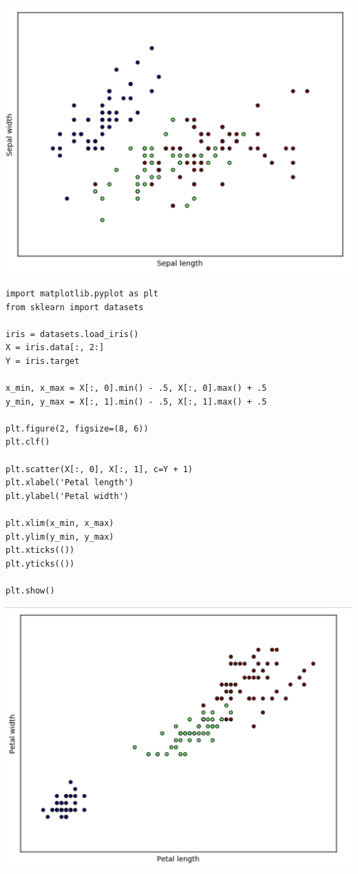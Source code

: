 \documentclass[12pt,reqno]{amsart}
\theoremstyle{definition}
\theoremstyle{remark}
\begin{document}
\includegraphics[width=0.9 \textwidth]{2.png}


\begin{lstlisting}
import matplotlib.pyplot as plt
from sklearn import datasets

iris = datasets.load_iris()
X = iris.data[:, 2:]
Y = iris.target

x_min, x_max = X[:, 0].min() - .5, X[:, 0].max() + .5
y_min, y_max = X[:, 1].min() - .5, X[:, 1].max() + .5

plt.figure(2, figsize=(8, 6))
plt.clf()

plt.scatter(X[:, 0], X[:, 1], c=Y + 1)
plt.xlabel('Petal length')
plt.ylabel('Petal width')

plt.xlim(x_min, x_max)
plt.ylim(y_min, y_max)
plt.xticks(())
plt.yticks(())

plt.show()
\end{lstlisting}

\includegraphics[width=0.9 \textwidth]{3.png}
\end{document}
